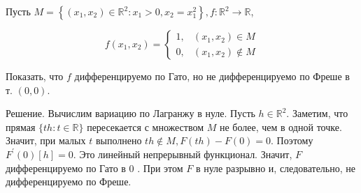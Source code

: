 \begin{task} Пусть $M=\left\{\left(x_{1}, x_{2}\right) \in \mathbb{R}^{2}: x_{1}>0, x_{2}=x_{1}^{2}\right\}, f: \mathbb{R}^{2} \rightarrow \mathbb{R}$,

    $$
    f\left(x_{1}, x_{2}\right)= \begin{cases}1, & \left(x_{1}, x_{2}\right) \in M \\ 0, & \left(x_{1}, x_{2}\right) \notin M\end{cases}
    $$
    
    Показать, что $f$ дифференцируемо по Гато, но не дифференцируемо по Фреше в т. $(0,0)$.
    
    Решение. Вычислим вариацию по Лагранжу в нуле. Пусть $h \in \mathbb{R}^{2}$. Заметим, что прямая $\{t h: t \in \mathbb{R}\}$ пересекается с множеством $M$ не более, чем в одной точке. Значит, при малых $t$ выполнено $t h \notin M, F(t h)-F(0)=0$. Поэтому $F^{\prime}(0)[h]=0$. Это линейный непрерывный функционал. Значит, $F$ дифференцируемо по Гато в 0 . При этом $F$ в нуле разрывно и, следовательно, не дифференцируемо по Фреше.
    \end{task}
    